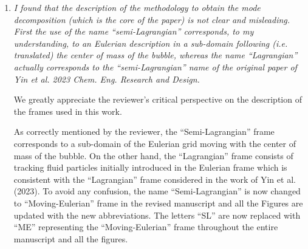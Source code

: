 \documentclass[a4paper]{article}
\begin{document}
\begin{enumerate}
\textcolor{blue}{P2. L26-30: In the context of a rising bubble, these techniques can provide a low-order representation of complex bubble dynamics—such as wake instabilities—through an in-depth analysis of the extracted modes. Depending on the flow regime and the level of complexity, the number of modes required to represent the full dynamics can vary substantially, and selecting an appropriate decomposition method that yields the fewest possible modes remains a persisting challenge.}

\textcolor{blue}{P2. L55-56: The findings of this paper can be used as a roadmap for mode analysis by identifying an efficient decomposition method that uses a small number of modes.}

Regarding the question of dimensionality reduction and information compression, our results show that for the 3D bubble case $C_5$ as the most complex case with 690 snapshots, a maximum of 15 modes is sufficient to accurately represent the full dataset, corresponding to a compression ratio of 46. This compares favorably with the work of Yin et al. (2023), where 30 modes were used to represent 140 snapshots of a deformed bubble, resulting in a compression ratio of roughly 4.6. This information is added on \textbf{page 17, Lines:386-389} as follows:

\textcolor{blue}{P17. L386-389: In particular, the rise characteristics of the 3D bubble $C_5$, as the most complex case with 690 snapshots, were estimated using 15 modes, yielding a compression ratio of 40. This is notably less than the number of modes used by Yin et al.(2023), who employed 30 modes to represent 140 snapshots, resulting in a compression ratio of approximately 4.6.}


\item
\textit{I found that the description of the methodology to obtain the mode decomposition (which is the core of the paper) is not clear and misleading. First the use of the name ``semi-Lagrangian'' corresponds, to my understanding, to an Eulerian description in a sub-domain following (i.e. translated) the center of mass of the bubble, whereas the name ``Lagrangian'' actually corresponds to the ``semi-Lagrangian'' name of the original paper of Yin et al. 2023 Chem. Eng. Research and Design.}
\vspace{.2cm}

We greatly appreciate the reviewer’s critical perspective on the description of the frames used in this work. 

As correctly mentioned by the reviewer, the ``Semi-Lagrangian'' frame corresponds to a sub-domain of the Eulerian grid moving with the center of mass of the bubble. On the other hand, the ``Lagrangian'' frame consists of tracking fluid particles initially introduced in the Eulerian frame which is consistent with the ``Lagrangian'' frame considered in the work of Yin et al. (2023). To avoid any confusion, the name ``Semi-Lagrangian'' is now changed to ``Moving-Eulerian'' frame in the revised manuscript and all the Figures are updated with the new abbreviations. The letters ``SL'' are now replaced with ``ME'' representing the ``Moving-Eulerian'' frame throughout the entire manuscript and all the figures.



\end{enumerate}
\end{document}
